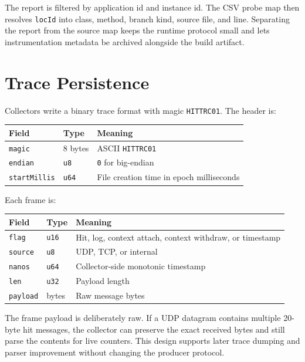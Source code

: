 \documentclass[11pt]{article}
\newcommand{\hittrace}{\texttt{HITTRC01}}
\newcommand{\code}[1]{\texttt{#1}}
\begin{document}
The report is filtered by application id and instance id. The CSV probe map
then resolves \code{locId} into class, method, branch kind, source file, and
line. Separating the report from the source map keeps the runtime protocol
small and lets instrumentation metadata be archived alongside the build
artifact.

\section{Trace Persistence}

Collectors write a binary trace format with magic \hittrace. The header is:

\begin{center}
\begin{tabular}{lll}
\textbf{Field} & \textbf{Type} & \textbf{Meaning} \\
\hline
\code{magic} & 8 bytes & ASCII \code{HITTRC01} \\
\code{endian} & \code{u8} & \code{0} for big-endian \\
\code{startMillis} & \code{u64} & File creation time in epoch milliseconds \\
\end{tabular}
\end{center}

Each frame is:

\begin{center}
\begin{tabular}{lll}
\textbf{Field} & \textbf{Type} & \textbf{Meaning} \\
\hline
\code{flag} & \code{u16} & Hit, log, context attach, context withdraw, or timestamp \\
\code{source} & \code{u8} & UDP, TCP, or internal \\
\code{nanos} & \code{u64} & Collector-side monotonic timestamp \\
\code{len} & \code{u32} & Payload length \\
\code{payload} & bytes & Raw message bytes \\
\end{tabular}
\end{center}

The frame payload is deliberately raw. If a UDP datagram contains multiple
20-byte hit messages, the collector can preserve the exact received bytes and
still parse the contents for live counters. This design supports later trace
dumping and parser improvement without changing the producer protocol.
\end{document}
